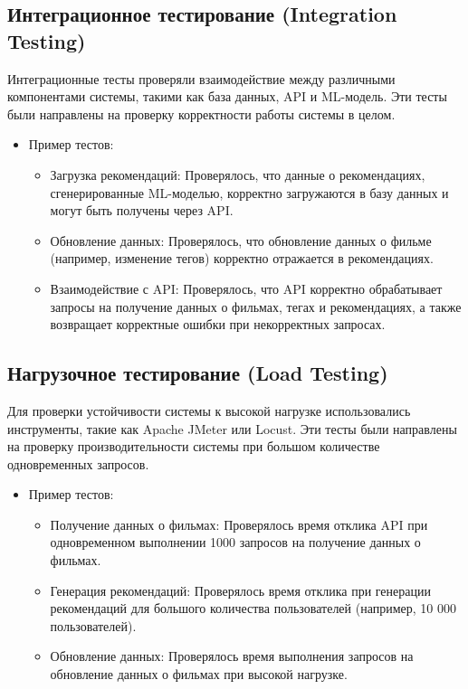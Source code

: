 \subsection*{Интеграционное тестирование (Integration Testing)}
Интеграционные тесты проверяли взаимодействие между различными компонентами системы, такими как база данных, API и ML-модель. Эти тесты были направлены на проверку корректности работы системы в целом.

\begin{itemize}
    \item Пример тестов:
    \begin{itemize}
        \item Загрузка рекомендаций: Проверялось, что данные о рекомендациях, сгенерированные ML-моделью, корректно загружаются в базу данных и могут быть получены через API.
        \item Обновление данных: Проверялось, что обновление данных о фильме (например, изменение тегов) корректно отражается в рекомендациях.
        \item Взаимодействие с API: Проверялось, что API корректно обрабатывает запросы на получение данных о фильмах, тегах и рекомендациях, а также возвращает корректные ошибки при некорректных запросах.
    \end{itemize}
\end{itemize}

\subsection*{Нагрузочное тестирование (Load Testing)}
Для проверки устойчивости системы к высокой нагрузке использовались инструменты, такие как Apache JMeter или Locust. Эти тесты были направлены на проверку производительности системы при большом количестве одновременных запросов.

\begin{itemize}
    \item Пример тестов:
    \begin{itemize}
        \item Получение данных о фильмах: Проверялось время отклика API при одновременном выполнении 1000 запросов на получение данных о фильмах.
        \item Генерация рекомендаций: Проверялось время отклика при генерации рекомендаций для большого количества пользователей (например, 10 000 пользователей).
        \item Обновление данных: Проверялось время выполнения запросов на обновление данных о фильмах при высокой нагрузке.
    \end{itemize}
\end{itemize}

